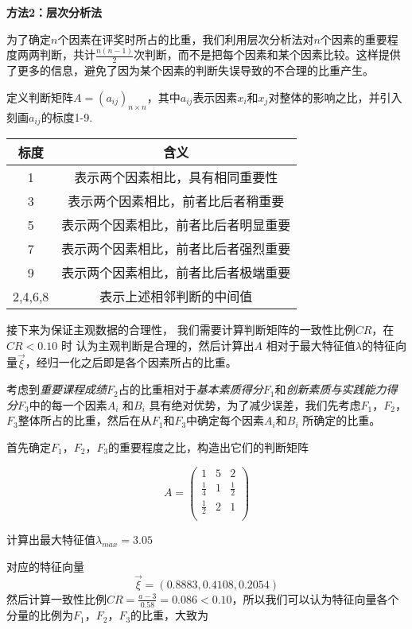\documentclass{ctexart}
\begin{document}
\newpage
\textbf{方法2：层次分析法}


为了确定$n$个因素在评奖时所占的比重，我们利用层次分析法对$n$个因素的重要程度两两判断，共计$\frac{n(n-1)}{2}$次判断，而不是把每个因素和某个因素比较。这样提供了更多的信息，避免了因为某个因素的判断失误导致的不合理的比重产生。

定义判断矩阵$A=(a_{ij})_{n\times n}$，其中$a_{ij}$表示因素$x_{i}$和$x_{j}$对整体的影响之比，并引入刻画$a_{ij}$的标度1-9.

\begin{table}[h]\small
\begin{tabular}{|c|c| }
\hline
标度&含义\\
\hline
1&表示两个因素相比，具有相同重要性\\
\hline
3&表示两个因素相比，前者比后者稍重要\\
\hline
5&表示两个因素相比，前者比后者明显重要\\
\hline
7&表示两个因素相比，前者比后者强烈重要\\
\hline
9&表示两个因素相比，前者比后者极端重要\\
\hline
2,4,6,8&表示上述相邻判断的中间值\\

\hline

\end{tabular}
\end{table}

接下来为保证主观数据的合理性，
我们需要计算判断矩阵的一致性比例$CR$，在$CR<0.10$ 时
认为主观判断是合理的，然后计算出$A$ 相对于最大特征值$\lambda$的特征向量$\overrightarrow{\xi}$，经归一化之后即是各个因素所占的比重。

考虑到\emph{重要课程成绩}$F_{2}$占的比重相对于\emph{基本素质得分}$F_{1}$和\emph{创新素质与实践能力得分}$F_{3}$中的每一个因素$A_{i}$ 和$B_{i}$ 具有绝对优势，为了减少误差，我们先考虑$F_{1}$，$F_{2}$，$F_{3}$整体所占的比重，然后在从$F_{1}$和$F_{3}$中确定每个因素$A_{i}$和$B_{i}$ 所确定的比重。

首先确定$F_{1}$，$F_{2}$，$F_{3}$的重要程度之比，构造出它们的判断矩阵

$$
A=\left(
\begin{array}{ccc}
1 &5& 2\\
    \frac{1}{4} &1& \frac{1}{2}\\
    \frac{1}{2}& 2& 1\\
\end{array}
\right)
$$

计算出最大特征值$\lambda_{max}=3.05$

对应的特征向量$$\overrightarrow{\xi}=(0.8883,0.4108,0.2054)$$
然后计算一致性比例$CR=\frac{a-3}{0.58}=0.086<0.10$，所以我们可以认为特征向量各个分量的比例为$F_{1}$，$F_{2}$，$F_{3}$的比重，大致为
\end{document}

